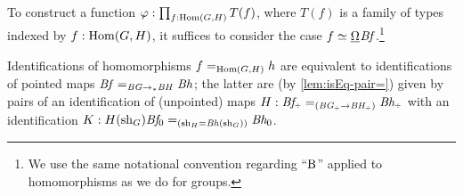 \begin{remark}\label{rem:Bf-convention}
  To construct a function $\varphi : \prod_{f:\Hom(G,H)}T(f)$,
  where $T(f)$ is a family of types indexed by $f:\Hom(G,H)$,
  it suffices to consider the case $f \jdeq \mkhom\Bf$.\footnote{%
    We use the same notational convention regarding ``$\mathrm{B}$''
    applied to homomorphisms as we do for groups.}

  Identifications of homomorphisms $f=_{\Hom(G,H)}h$
  are equivalent to identifications of pointed maps
  $\mathit{B}\mathit{f} =_{\mathit{B}\mathit{G}\to_\ast\mathit{B}\mathit{H}} \mathit{B}\mathit{h}$;
  the latter are (by \cref{lem:isEq-pair=}) given by
  pairs of an identification of (unpointed) maps
  $H : \Bf_\div =_{(\BG_\div \to \BH_\div)} \Bh_\div$ with an identification
  $K : H(\mathrm{sh}_G)\mathit{B}\mathit{f}_0 =_{(\mathrm{sh}_H=\mathit{B}\mathit{h}(\mathrm{sh}_G))} \mathit{B}\mathit{h}_0$.
\end{remark}


